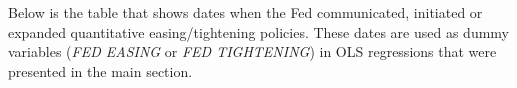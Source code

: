 \documentclass[11pt,a4paper,english,oneside]{article}
\begin{document}
\newpage




\begin{appendices}

Below is the table that shows dates when the Fed communicated, initiated or expanded quantitative easing/tightening policies. These dates are used as dummy variables (\textit{FED EASING} or \textit{FED TIGHTENING}) in OLS regressions that were presented in the main section.


\end{appendices}
\end{document}

